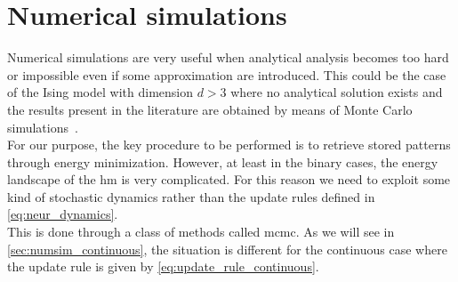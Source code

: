 \documentclass[\rootdir/main.tex]{subfiles}
\begin{document}
\chapter{Numerical simulations}\label{chap:numerical_sim}
Numerical simulations are very useful when analytical analysis becomes too hard or impossible even if some approximation are introduced. This could be the case of the Ising model with dimension $d > 3$ where no analytical solution exists and the results present in the literature are obtained by means of Monte Carlo simulations~\parencite[\eg][]{Cosme_2015,3d_ising}.\\
For our purpose, the key procedure to be performed is to retrieve stored patterns through energy minimization. However, at least in the binary cases, the energy landscape of the \acrlong{hm} is very complicated. For this reason we need to exploit some kind of stochastic dynamics rather than the update rules defined in \cref{eq:neur_dynamics}.\\
This is done through a class of methods called \acrfull{mcmc}. As we will see in \cref{sec:numsim_continuous}, the situation is different for the continuous case where the update rule is given by \cref{eq:update_rule_continuous}.
\end{document}
